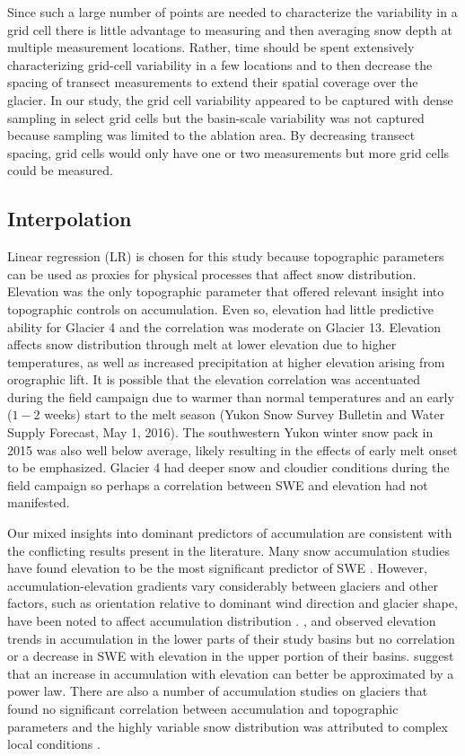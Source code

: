 \documentclass[twocolumn,letterpaper]{igs}
\begin{document}
Since such a large number of points are needed to characterize the variability in a grid cell there is little advantage to measuring and then averaging snow depth at multiple measurement locations. Rather, time should be spent extensively characterizing grid-cell variability in a few locations and to then decrease the spacing of transect measurements to extend their spatial coverage over the glacier. In our study, the grid cell variability appeared to be captured with dense sampling in select grid cells but the basin-scale variability was not captured because sampling was limited to the ablation area. By decreasing transect spacing, grid cells would only have one or two measurements but more grid cells could be measured. 

\subsection{Interpolation}

Linear regression (LR) is chosen for this study because topographic parameters can be used as proxies for physical processes that affect snow distribution. Elevation was the only topographic parameter that offered relevant insight into topographic controls on accumulation. Even so, elevation had little predictive ability for Glacier 4 and the correlation was moderate on Glacier 13. Elevation affects snow distribution through melt at lower elevation due to higher temperatures, as well as increased precipitation at higher elevation arising from orographic lift. It is possible that the elevation correlation was accentuated during the field campaign due to warmer than normal temperatures and an early ($1-2$ weeks) start to the melt season (Yukon Snow Survey Bulletin and Water Supply Forecast, May 1, 2016). The southwestern Yukon winter snow pack in 2015 was also well below average, likely resulting in the effects of early melt onset to be emphasized. Glacier 4 had deeper snow and cloudier conditions during the field campaign so perhaps a correlation between SWE and elevation had not manifested. 

Our mixed insights into dominant predictors of accumulation are consistent with the conflicting results present in the literature. Many snow accumulation studies have found elevation to be the most significant predictor of SWE \citep[e.g.][]{Machguth2006, McGrath2015}. However, accumulation-elevation gradients vary considerably between glaciers \citep{Winther1998} and other factors, such as orientation relative to dominant wind direction and glacier shape, have been noted to affect accumulation distribution \citep{Machguth2006,Grabiec2011}.  \cite{Machguth2006}, \cite{Grunewald2014} and \cite{Kirchner2014} observed elevation trends in accumulation in the lower parts of their study basins but no correlation or a decrease in SWE with elevation in the upper portion of their basins. \cite{Helbig2017} suggest that an increase in accumulation with elevation can better be approximated by a power law. There are also a number of accumulation studies on glaciers that found no significant correlation between accumulation and topographic parameters and the highly variable snow distribution was attributed to complex local conditions \citep[e.g.][]{Grabiec2011,Lopez2011}.
\end{document}
